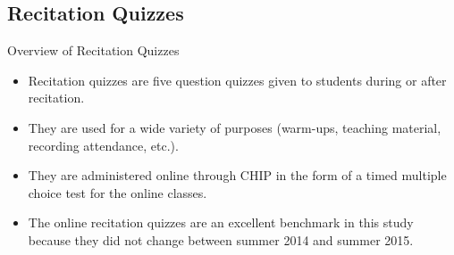 \documentclass{beamer}
\begin{document}
\subsection*{Recitation Quizzes}

\begin{frame}{Overview of Recitation Quizzes}
  \begin{itemize}
    \item Recitation quizzes are five question quizzes given to students during or after recitation.
    \item They are used for a wide variety of purposes (warm-ups, teaching material, recording attendance, etc.).
    \item They are administered online through CHIP in the form of a timed multiple choice test for the online classes.
    \item The online recitation quizzes are an excellent benchmark in this study because they did not change between summer 2014 and summer 2015.
  \end{itemize}
\end{frame}
\end{document}
